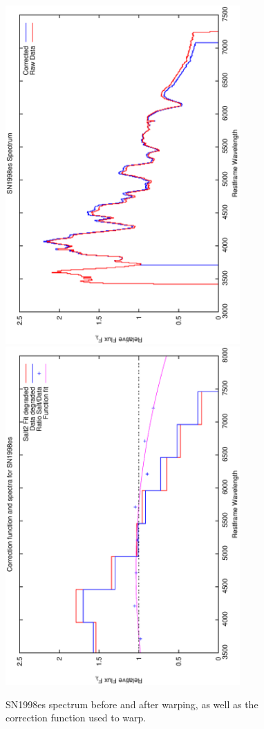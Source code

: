 \clearpage

\begin{figure}[p]
\centering
\includegraphics[angle=-90,width=0.8\textwidth]{./figures/spectrabeforeafter/SN1998es_handpicked_v001_v024_before_after_spectra.ps}
\hfill
\includegraphics[angle=-90,width=0.8\textwidth]{./figures/corrections/SN1998es_v001_correction.ps}
\hfill
\caption{SN1998es spectrum before and after warping, as well as the correction function used to warp.}
\label{fig:SN1998esfour1}
\end{figure}

